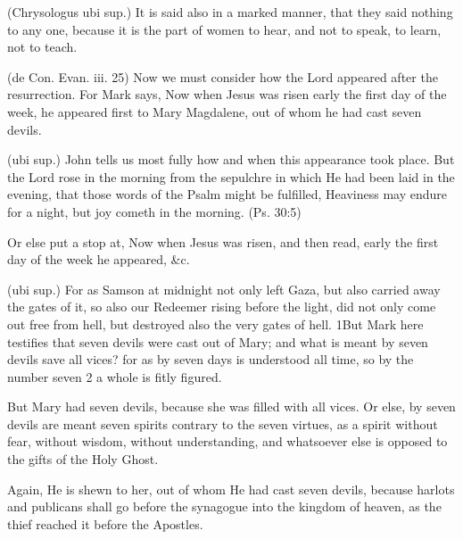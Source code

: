  (Chrysologus ubi sup.) It is said also in a marked manner, that they said nothing to any one, because it is the part of women to hear, and not to speak, to learn, not to teach.

 

 (de Con. Evan. iii. 25) Now we must consider how the Lord appeared after the resurrection. For Mark says, Now when Jesus was risen early the first day of the week, he appeared first to Mary Magdalene, out of whom he had cast seven devils.

 (ubi sup.) John tells us most fully how and when this appearance took place. But the Lord rose in the morning from the sepulchre in which He had been laid in the evening, that those words of the Psalm might be fulfilled, Heaviness may endure for a night, but joy cometh in the morning. (Ps. 30:5)

 Or else put a stop at, Now when Jesus was risen, and then read, early the first day of the week he appeared, \&c.

 (ubi sup.) For as Samson at midnight not only left Gaza, but also carried away the gates of it, so also our Redeemer rising before the light, did not only come out free from hell, but destroyed also the very gates of hell. 1But Mark here testifies that seven devils were cast out of Mary; and what is meant by seven devils save all vices? for as by seven days is understood all time, so by the number seven 2 a whole is fitly figured.

 But Mary had seven devils, because she was filled with all vices. Or else, by seven devils are meant seven spirits contrary to the seven virtues, as a spirit without fear, without wisdom, without understanding, and whatsoever else is opposed to the gifts of the Holy Ghost.

 Again, He is shewn to her, out of whom He had cast seven devils, because harlots and publicans shall go before the synagogue into the kingdom of heaven, as the thief reached it before the Apostles.

